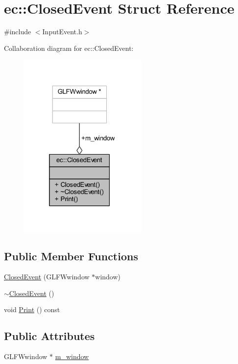 \hypertarget{structec_1_1_closed_event}{}\section{ec\+:\+:Closed\+Event Struct Reference}
\label{structec_1_1_closed_event}


{\ttfamily \#include $<$Input\+Event.\+h$>$}



Collaboration diagram for ec\+:\+:Closed\+Event\+:\nopagebreak
\begin{figure}[H]
\begin{center}
\leavevmode
\includegraphics[width=181pt]{structec_1_1_closed_event__coll__graph}
\end{center}
\end{figure}
\subsection*{Public Member Functions}
\begin{DoxyCompactItemize}
\item 
\mbox{\hyperlink{structec_1_1_closed_event_a70ac7681a32c7abbc97add221d7d9477}{Closed\+Event}} (G\+L\+F\+Wwindow $\ast$window)
\item 
\mbox{\hyperlink{structec_1_1_closed_event_a59918a40f5034b5ece54db3d16900f31}{$\sim$\+Closed\+Event}} ()
\item 
void \mbox{\hyperlink{structec_1_1_closed_event_aa40d7f2ab8263bedc927d289a4a20190}{Print}} () const
\end{DoxyCompactItemize}
\subsection*{Public Attributes}
\begin{DoxyCompactItemize}
\item 
G\+L\+F\+Wwindow $\ast$ \mbox{\hyperlink{structec_1_1_closed_event_acd70453a645b12b21857e4e3a47f1294}{m\+\_\+window}}
\end{DoxyCompactItemize}


